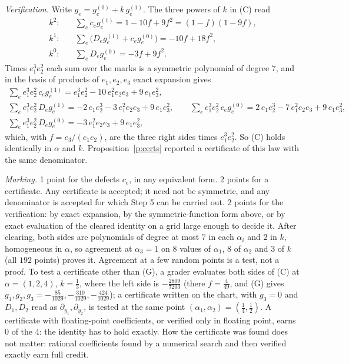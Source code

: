 \documentclass[11pt]{article}
\theoremstyle{plain}
\theoremstyle{definition}
\theoremstyle{remark}
\begin{document}
\emph{Verification.} Write $g_e=g^{(0)}_e+k\,g^{(1)}_e$. The three powers of $k$ in (C) read
\begin{align*}
k^2:&\quad \textstyle\sum_ec_eg^{(1)}_e=1-10f+9f^2=(1-f)(1-9f),\\
k^1:&\quad \textstyle\sum_e\big(D_eg^{(1)}_e+c_eg^{(0)}_e\big)=-10f+18f^2,\\
k^0:&\quad \textstyle\sum_eD_eg^{(0)}_e=-3f+9f^2 .
\end{align*}
Times $e_1^3e_2^2$ each sum over the marks is a symmetric polynomial of degree $7$, and in the basis of products of $e_1,e_2,e_3$ exact expansion gives
\begin{gather*}
\textstyle\sum_ee_1^3e_2^2\,c_eg^{(1)}_e=e_1^3e_2^2-10\,e_1^2e_2e_3+9\,e_1e_3^2,\\
\textstyle\sum_ee_1^3e_2^2\,D_eg^{(1)}_e=-2\,e_1e_2^3-3\,e_1^2e_2e_3+9\,e_1e_3^2,\qquad
\sum_ee_1^3e_2^2\,c_eg^{(0)}_e=2\,e_1e_2^3-7\,e_1^2e_2e_3+9\,e_1e_3^2,\\
\textstyle\sum_ee_1^3e_2^2\,D_eg^{(0)}_e=-3\,e_1^2e_2e_3+9\,e_1e_3^2,
\end{gather*}
which, with $f=e_3/(e_1e_2)$, are the three right sides times $e_1^3e_2^2$. So (C) holds identically in $\alpha$ and $k$. Proposition~\ref{p:certs} reported a certificate of this law with the same denominator.

\smallskip\noindent\emph{Marking.} 1 point for the defects $c_e$, in any equivalent form. 2 points for a certificate. Any certificate is accepted; it need not be symmetric, and any denominator is accepted for which Step 5 can be carried out. 2 points for the verification: by exact expansion, by the symmetric-function form above, or by exact evaluation of the cleared identity on a grid large enough to decide it. After clearing, both sides are polynomials of degree at most $7$ in each $\alpha_i$ and $2$ in $k$, homogeneous in $\alpha$, so agreement at $\alpha_3=1$ on $8$ values of $\alpha_1$, $8$ of $\alpha_2$ and $3$ of $k$ (all $192$ points) proves it. Agreement at a few random points is a test, not a proof. To test a certificate other than (G), a grader evaluates both sides of (C) at $\alpha=(1,2,4)$, $k=\frac13$, where the left side is $-\frac{2809}{7203}$ (there $f=\frac4{49}$, and (G) gives $g_1,g_2,g_3=-\frac{85}{1029},-\frac{310}{1029},-\frac{424}{1029}$); a certificate written on the chart, with $g_3=0$ and $D_1,D_2$ read as $\partial_{y_1},\partial_{y_2}$, is tested at the same point $(\alpha_1,\alpha_2)=(\frac14,\frac12)$. A certificate with floating-point coefficients, or verified only in floating point, earns 0 of the 4: the identity has to hold exactly. How the certificate was found does not matter: rational coefficients found by a numerical search and then verified exactly earn full credit.
\end{document}

